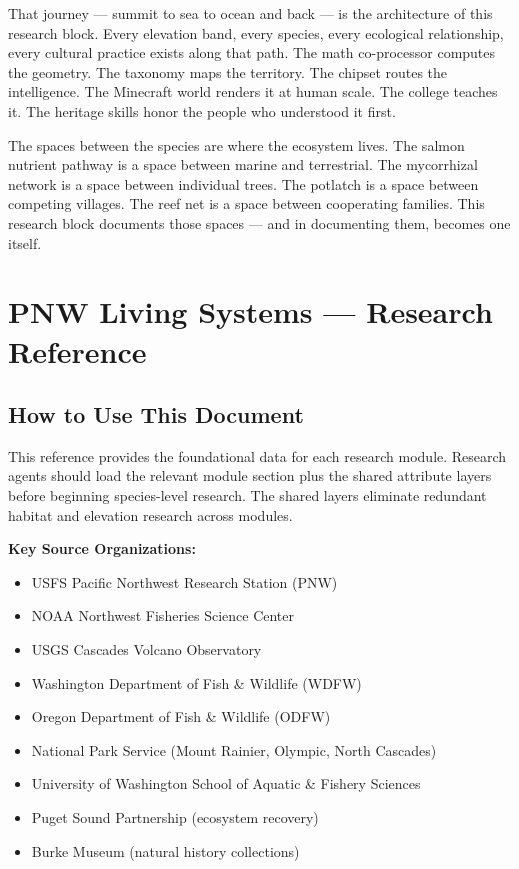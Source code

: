\documentclass[11pt,letterpaper]{article}
\newcommand{\stageheader}[2]{%
  \noindent\colorbox{#2}{\makebox[\textwidth][l]{%
    \textcolor{white}{\bfseries\sffamily\hspace{6pt}#1\hspace{6pt}}}}%
  \vspace{0.5em}\par%
}
\begin{document}
That journey --- summit to sea to ocean and back --- is the architecture of this research block. Every elevation band, every species, every ecological relationship, every cultural practice exists along that path. The math co-processor computes the geometry. The taxonomy maps the territory. The chipset routes the intelligence. The Minecraft world renders it at human scale. The college teaches it. The heritage skills honor the people who understood it first.

The spaces between the species are where the ecosystem lives. The salmon nutrient pathway is a space between marine and terrestrial. The mycorrhizal network is a space between individual trees. The potlatch is a space between competing villages. The reef net is a space between cooperating families. This research block documents those spaces --- and in documenting them, becomes one itself.

\newpage

\stageheader{STAGE 2 --- RESEARCH REFERENCE}{secondary}

\section{PNW Living Systems --- Research Reference}

\subsection{How to Use This Document}

This reference provides the foundational data for each research module. Research agents should load the relevant module section plus the shared attribute layers before beginning species-level research. The shared layers eliminate redundant habitat and elevation research across modules.

\textbf{Key Source Organizations:}
\begin{itemize}[leftmargin=2em]
\item USFS Pacific Northwest Research Station (PNW)
\item NOAA Northwest Fisheries Science Center
\item USGS Cascades Volcano Observatory
\item Washington Department of Fish \& Wildlife (WDFW)
\item Oregon Department of Fish \& Wildlife (ODFW)
\item National Park Service (Mount Rainier, Olympic, North Cascades)
\item University of Washington School of Aquatic \& Fishery Sciences
\item Puget Sound Partnership (ecosystem recovery)
\item Burke Museum (natural history collections)
\end{itemize}
\end{document}
